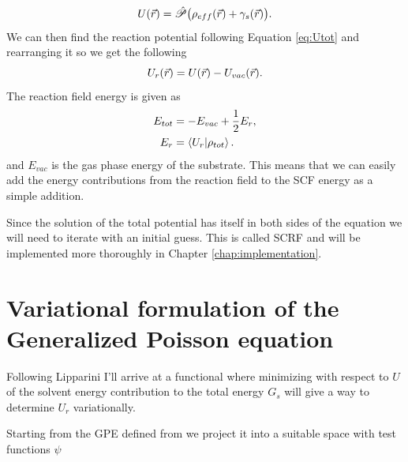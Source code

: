 \documentclass[../Thesis.tex]{subfiles}
\begin{document}
\begin{equation}
  U(\vec{r}) = \hat{\mathscr{P}}\big( \rho_{eff}(\vec{r}) + \gamma_s(\vec{r})\big).
\end{equation}
We can then find the reaction potential following Equation \ref{eq:Utot} and
rearranging it so we get the following
\begin{equation}
  U_r(\vec{r}) = U(\vec{r}) - U_{vac}(\vec{r}).
\end{equation}
The reaction field energy is given as \cite{FossoTande:2013ka}
\begin{align}
  E_{tot} &= - E_{vac} + \frac{1}{2}E_r, \\
  E_r &= \braket{U_r | \rho_{tot}}.
\end{align}
and $E_{vac}$ is the gas phase energy of the substrate. This means that we
can easily add the energy contributions from the reaction field to the \ac{SCF} energy
as a simple addition.

Since the solution of
the total potential has itself in both sides of the
equation we will need to iterate with an initial guess. This is called \ac{SCRF}
and will be implemented more thoroughly in Chapter \ref{chap:implementation}.

\section{Variational formulation of the Generalized Poisson equation}
Following Lipparini \cite{Lipparini:2010bg, Lipparini:2013} I'll arrive at a functional where
minimizing with respect to $U$ of the solvent energy contribution to
the total energy $G_s$ will give a way to determine $U_r$ variationally.

Starting from the \ac{GPE} defined from \cite{FossoTande:2013ka} we project it
into a suitable space with test functions $\psi$
\end{document}
